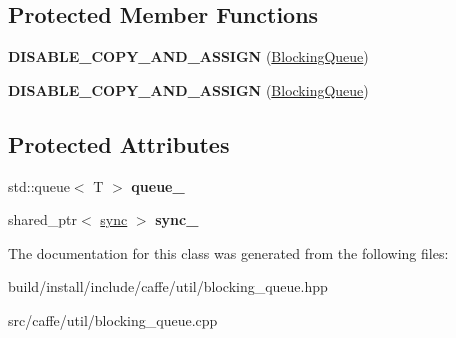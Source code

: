 \subsection*{Protected Member Functions}
\begin{DoxyCompactItemize}
\item 
\mbox{\label{classcaffe_1_1_blocking_queue_afbc6f67dfc1571625178b46807e09139}} 
{\bfseries D\+I\+S\+A\+B\+L\+E\+\_\+\+C\+O\+P\+Y\+\_\+\+A\+N\+D\+\_\+\+A\+S\+S\+I\+GN} (\mbox{\hyperlink{classcaffe_1_1_blocking_queue}{Blocking\+Queue}})
\item 
\mbox{\label{classcaffe_1_1_blocking_queue_afbc6f67dfc1571625178b46807e09139}} 
{\bfseries D\+I\+S\+A\+B\+L\+E\+\_\+\+C\+O\+P\+Y\+\_\+\+A\+N\+D\+\_\+\+A\+S\+S\+I\+GN} (\mbox{\hyperlink{classcaffe_1_1_blocking_queue}{Blocking\+Queue}})
\end{DoxyCompactItemize}
\subsection*{Protected Attributes}
\begin{DoxyCompactItemize}
\item 
\mbox{\label{classcaffe_1_1_blocking_queue_a6b61d71136216319c2a9b7ccdba92e36}} 
std\+::queue$<$ T $>$ {\bfseries queue\+\_\+}
\item 
\mbox{\label{classcaffe_1_1_blocking_queue_a35b6e3110ff4ae79b90bc59aa93930e9}} 
shared\+\_\+ptr$<$ \mbox{\hyperlink{classcaffe_1_1_blocking_queue_1_1sync}{sync}} $>$ {\bfseries sync\+\_\+}
\end{DoxyCompactItemize}


The documentation for this class was generated from the following files\+:\begin{DoxyCompactItemize}
\item 
build/install/include/caffe/util/blocking\+\_\+queue.\+hpp\item 
src/caffe/util/blocking\+\_\+queue.\+cpp\end{DoxyCompactItemize}
